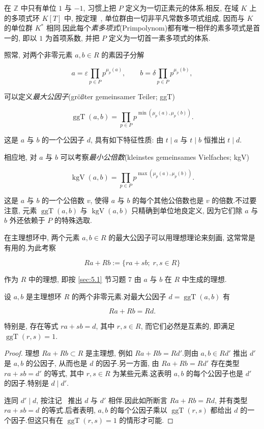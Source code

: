 在 $\mathbb{Z}$ 中只有单位 $1$ 与 $-1$, 习惯上把 $P$ 定义为一切正素元的体系.相反, 在域 $K$ 上的多项式环 $K[T]$ 中, 按定理~, 单位群由一切非平凡常数多项式组成, 因而与 $K$ 的单位群 $K^*$ 相同.因此每个\emph{素多项式}(\textup{Primpolynom})都有唯一相伴的素多项式是首一的, 即以 $1$ 为首项系数, 并把 $P$ 定义为一切首一素多项式的体系.

照常, 对两个非零元素 $a, b \in R$ 的素因子分解

\[
a = \varepsilon \prod_{p \in P} p^{\mu_p(a)}, \qquad b = \delta \prod_{p \in P} p^{\mu_p(b)},
\]

可以定义\emph{最大公因子}(\textup{größter gemeinsamer Teiler; ggT})

\[
\operatorname{ggT}(a, b) = \prod_{p \in P} p^{\min(\mu_p(a), \mu_p(b))}\text{.}
\]

这是 $a$ 与 $b$ 的一个公因子 $d$, 具有如下特征性质: 由 $t \mid a$ 与 $t \mid b$ 恒推出 $t \mid d$.

相应地, 对 $a$ 与 $b$ 可以考察\emph{最小公倍数}(\textup{kleinstes gemeinsames Vielfaches; kgV})

\[
\operatorname{kgV}(a, b) = \prod_{p \in P} p^{\max(\mu_p(a), \mu_p(b))}\text{.}
\]

这是 $a$ 与 $b$ 的一个公倍数 $v$, 使得 $a$ 与 $b$ 的每个其他公倍数也是 $v$ 的倍数.不过要注意, 元素 $\operatorname{ggT}(a, b)$ 与 $\operatorname{kgV}(a, b)$ 只精确到单位地良定义, 因为它们除 $a$ 与 $b$ 外还依赖于 $P$ 的特殊选取.

在主理想环中, 两个元素 $a, b \in R$ 的最大公因子可以用理想理论来刻画, 这常常是有用的.为此考察

\[
Ra + Rb := \{ra + sb;\; r, s \in R\}
\]

作为 $R$ 中的理想, 即按 \ref{sec:5.1} 节习题 7 由 $a$ 与 $b$ 在 $R$ 中生成的理想.

\begin{theorem}\label{thm:5.2.16}
设 $a, b$ 是主理想环 $R$ 的两个非零元素.对最大公因子 $d = \operatorname{ggT}(a, b)$ 有

\[
Ra + Rb = Rd\text{.}
\]

特别是, 存在等式 $ra + sb = d$, 其中 $r, s \in R$, 而它们必然是互素的, 即满足 $\operatorname{ggT}(r, s) = 1$.
\end{theorem}

\begin{proof}
理想 $Ra + Rb \subset R$ 是主理想, 例如 $Ra + Rb = Rd'$.则由 $a, b \in Rd'$ 推出 $d'$ 是 $a, b$ 的公因子, 从而也是 $d$ 的因子.另一方面, 由 $Ra + Rb = Rd'$ 存在类型 $ra + sb = d'$ 的等式, 其中 $r, s \in R$ 为某些元素.这表明 $a, b$ 的每个公因子也是 $d'$ 的因子.特别是 $d \mid d'$.

连同 $d' \mid d$, 按注记~ 推出 $d$ 与 $d'$ 相伴.因此如所断言 $Ra + Rb = Rd$, 并有类型 $ra + sb = d$ 的等式.后者表明, $a, b$ 的每个公因子乘以 $\operatorname{ggT}(r, s)$ 都给出 $d$ 的一个因子.但这只有在 $\operatorname{ggT}(r, s) = 1$ 的情形才可能.
\end{proof}

